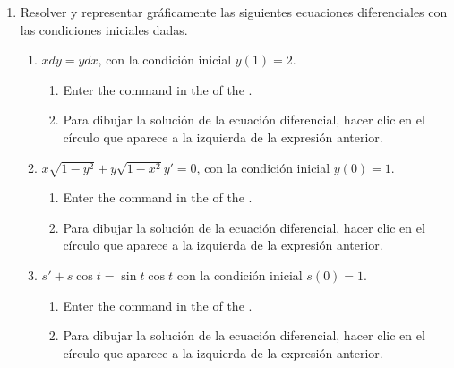 \begin{enumerate}[leftmargin=*]
\item Resolver y representar gráficamente las siguientes ecuaciones diferenciales con las condiciones iniciales dadas.
      \begin{enumerate}
      \item $xdy=ydx$, con la condición inicial $y(1)=2$.
            \begin{indication}
            \begin{enumerate}
            \item Enter the command  in the  of the .
            \item Para dibujar la solución de la ecuación diferencial, hacer clic en el círculo que aparece a la izquierda de la expresión anterior.
            \end{enumerate}
            \end{indication}

      \item $x\sqrt{1-y^2}+y\sqrt{1-x^2} y'=0$, con la condición inicial $y(0)=1$.
            \begin{indication}
            \begin{enumerate}
            \item Enter the command  in the  of the .
            \item Para dibujar la solución de la ecuación diferencial, hacer clic en el círculo que aparece a la izquierda de la expresión anterior.
            \end{enumerate}
            \end{indication}

      \item $s'+s\cos t=\sin t\cos t$ con la condición inicial $s(0)=1$.
            \begin{indication}
            \begin{enumerate}
            \item Enter the command  in the  of the .
            \item Para dibujar la solución de la ecuación diferencial, hacer clic en el círculo que aparece a la izquierda de la expresión anterior.
            \end{enumerate}
            \end{indication}


\end{enumerate}
\end{enumerate}

